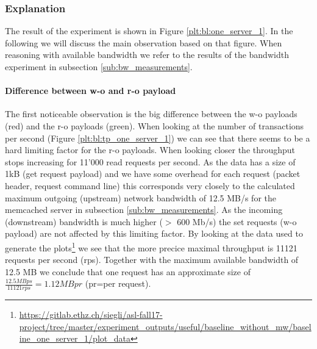 \documentclass[11pt,a4paper]{article}
\begin{document}
\subsubsection{Explanation}

The result of the experiment is shown in Figure \ref{plt:bl:one_server_1}. In the following we will discuss the main observation based on that figure.
When reasoning with available bandwidth we refer to the results of the bandwidth experiment in subsection \ref{sub:bw_measurements}.

\paragraph{Difference between w-o and r-o payload}
The first noticeable observation is the big difference between the w-o payloads (red) and the r-o payloads (green). When looking at the number of transactions per second (Figure \ref{plt:bl:tp_one_server_1}) we can see that there seems to be a hard limiting factor for the r-o payloads. When looking closer the throughput stops increasing for 11'000 read requests per second. As the data has a size of 1kB (get request payload) and we have some overhead for each request (packet header, request command line) this corresponds very closely to the calculated maximum outgoing (upstream) network bandwidth of 12.5 MB/s for the memcached server in subsection \ref{sub:bw_measurements}. As the incoming (downstream) bandwidth is much higher ($>$ 600 Mb/s) the set requests (w-o payload) are not affected by this limiting factor. By looking at the data used to generate the plots\footnote{\url{https://gitlab.ethz.ch/siegli/asl-fall17-project/tree/master/experiment_outputs/useful/baseline_without_mw/baseline_one_server_1/plot_data}} we see that the more precice maximal throughput is 11121 requests per second (rps). Together with the maximum available bandwidth of 12.5 MB we conclude that one request has an approximate size of $\frac{12.5 MBps}{11121rps} = 1.12 MBpr$ (pr=per request).
\end{document}
